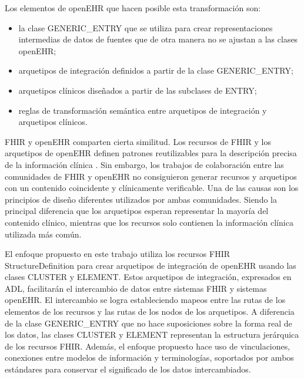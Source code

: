Los elementos de openEHR que hacen posible esta transformación son:
\begin{itemize}
  \item la clase GENERIC\_ENTRY que se utiliza para crear representaciones intermedias de datos de fuentes que de otra manera no se ajustan a las clases openEHR;
  \item arquetipos de integración definidos a partir de la clase GENERIC\_ENTRY;
  \item arquetipos clínicos diseñados a partir de las subclases de ENTRY;
  \item reglas de transformación semántica entre arquetipos de integración y arquetipos clínicos.
\end{itemize}

FHIR y openEHR comparten cierta similitud. Los recursos de FHIR y los arquetipos de openEHR definen patrones reutilizables para la descripción precisa de la información clínica \cite{Bosca15}. Sin embargo, los trabajos de colaboración entre las comunidades de FHIR y openEHR \cite{Collaboration} no consiguieron generar recursos y arquetipos con un contenido coincidente y clínicamente verificable. Una de las causas son los principios de diseño diferentes utilizados por ambas comunidades. Siendo la principal diferencia que los arquetipos esperan representar la mayoría del contenido clínico, mientras que los recursos solo contienen la información clínica utilizada más común.

El enfoque propuesto en este trabajo utiliza los recursos FHIR StructureDefinition para crear arquetipos de integración de openEHR usando las clases CLUSTER y ELEMENT. Estos arquetipos de integración, expresados en ADL, facilitarán el intercambio de datos entre sistemas FHIR y sistemas openEHR. El intercambio se logra estableciendo mapeos entre las rutas de los elementos de los recursos y las rutas de los nodos de los arquetipos. A diferencia de la clase GENERIC\_ENTRY que no hace suposiciones sobre la forma real de los datos, las clases CLUSTER y ELEMENT representan la estructura jerárquica de los recursos FHIR. Además, el enfoque propuesto hace uso de vinculaciones, conexiones entre modelos de información y terminologías, soportados por ambos estándares para conservar el significado de los datos intercambiados.
